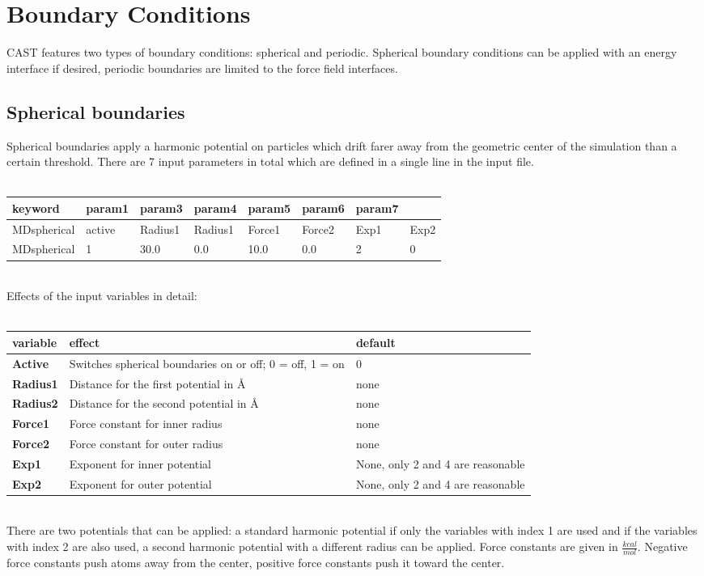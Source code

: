 \documentclass[10pt,a4paper]{article} %
\begin{document}
	\section{Boundary Conditions}
	\label{sec:boundary}
	\ac{CAST} features two types of boundary conditions: spherical and periodic. Spherical boundary conditions can be applied with an energy interface if desired, periodic boundaries are limited to the force field interfaces.

	\subsection{Spherical boundaries}
	Spherical boundaries apply a harmonic potential on particles which drift farer away from the geometric center of the simulation than a certain threshold. There are 7 input parameters in total which are defined in a single line in the input file. \\~\\

	\begin{tabularx}{\textwidth}{l|X|X|X|X|X|X|X}
		keyword & param1 & param3 & param4 & param5 & param6 & param7 \\
		\hline
		MDspherical & active & Radius1 & Radius1 & Force1 & Force2 & Exp1 & Exp2 \\
		MDspherical & 1 & 30.0 & 0.0 & 10.0 & 0.0 & 2 & 0 \\
	\end{tabularx}~\\

	Effects of the input variables in detail:\\~\\
	\begin{tabularx}{\textwidth}{l|X|X}
		\textbf{variable} & effect & default \\
		\hline
		\textbf{Active} & Switches spherical boundaries on or off; 0 = off, 1 = on & 0 \\
		\textbf{Radius1} & Distance for the first potential in \AA & none \\
		\textbf{Radius2} & Distance for the second potential in \AA & none \\
		\textbf{Force1} & Force constant for inner radius & none \\
		\textbf{Force2} & Force constant for outer radius & none \\
		\textbf{Exp1} & Exponent for inner potential & None, only 2 and 4 are reasonable \\
		\textbf{Exp2} & Exponent for outer potential & None, only 2 and 4 are reasonable \\
	\end{tabularx}~\\
	There are two potentials that can be applied: a standard harmonic potential if only the variables with index 1 are used and if the variables with index 2 are also used, a second harmonic potential with a different radius can be applied.
	Force constants are given in $\frac{kcal}{mol}$. Negative force constants push atoms away from the center, positive force constants push it toward the center.
\end{document}
